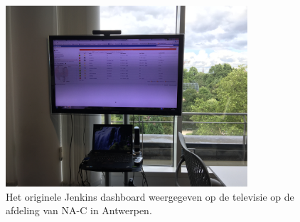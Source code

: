 \documentclass[10pt,a4paper]{article}
\begin{document}
\begin{figure}[ht!]
\centering
\includegraphics[width=90mm]{tvdashboardoriginal.jpg}
\caption{Het originele Jenkins dashboard weergegeven op de televisie op de afdeling van NA-C in Antwerpen.} 
\label{tv_1}
\end{figure}
\end{document}
